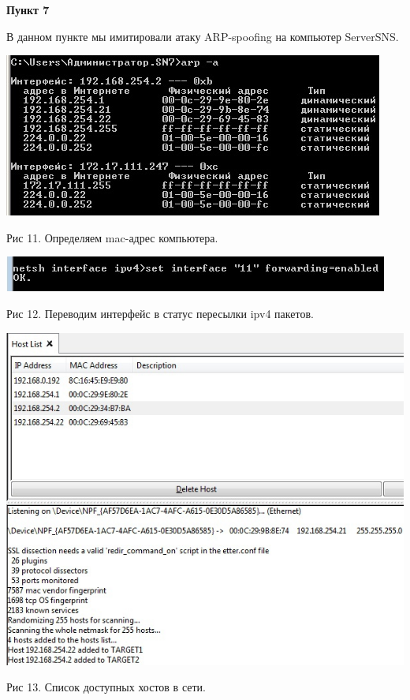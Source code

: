 \documentclass[a4paper,14pt]{extarticle}
\begin{document}
    \textbf{Пункт 7}
    \vspace{-3ex}
    \begin{center}
        \singlespacing
        В данном пункте мы имитировали атаку ARP-spoofing на компьютер ServerSNS.

        \includegraphics[scale=0.8]{pics/7_1.jpg}
        
        Рис 11. Определяем mac-адрес компьютера.

        \includegraphics[scale=0.8]{pics/7_2.jpg}

        Рис 12. Переводим интерфейс в статус пересылки ipv4 пакетов.

        \includegraphics[scale=0.64]{pics/7_3.jpg}

        Рис 13. Список доступных хостов в сети.


\end{center}
\end{document}
